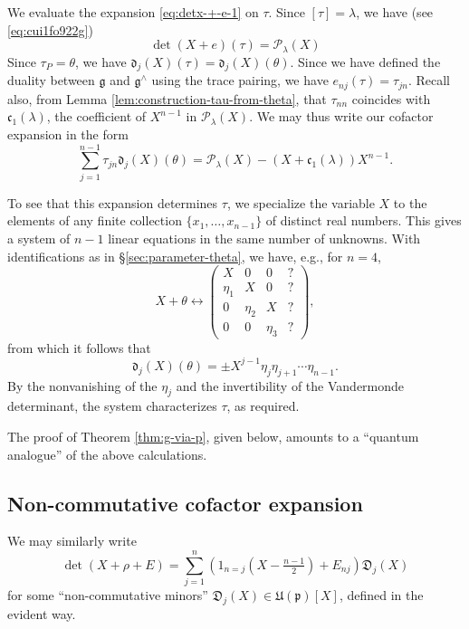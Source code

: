 
We evaluate the expansion \eqref{eq:detx-+-e-1} on $\tau$.  Since $[\tau] = \lambda$, we have (see \eqref{eq:cui1fo922g})
\begin{equation*}
  \det(X + e)(\tau) = \mathcal{P}_\lambda(X)
\end{equation*}
Since $\tau_P = \theta$, we have $\mathfrak{d}_j(X)(\tau) = \mathfrak{d}_j(X)(\theta)$.  Since we have defined the duality between $\mathfrak{g}$ and $\mathfrak{g}^\wedge$ using the trace pairing, we have $e_{n j}(\tau) = \tau_{j n}$.  Recall also, from Lemma \ref{lem:construction-tau-from-theta}, that $\tau_{n n}$ coincides with $\mathfrak{c}_1(\lambda)$, the coefficient of $X^{n-1}$ in $\mathcal{P}_\lambda(X)$.  We may thus write our cofactor expansion in the form
\[
  \sum_{j=1}^{n-1} \tau_{j n} \mathfrak{d}_j(X)(\theta) = \mathcal{P}_\lambda(X) - (X + \mathfrak{c}_1(\lambda)) X^{n-1}.
\]

To see that this expansion determines $\tau$, we specialize the variable $X$ to the elements of any finite collection $\{x_1,\dotsc,x_{n-1}\}$ of distinct real numbers.  This gives a system of $n-1$ linear equations in the same number of unknowns.  With identifications as in \S\ref{sec:parameter-theta}, we have, e.g., for $n=4$,
\begin{equation*}
  X + \theta
  \leftrightarrow
  \begin{pmatrix}
    X & 0 & 0 & ? \\
    \eta_1  & X  & 0 & ? \\
    0 & \eta_2  & X & ? \\
    0 & 0 & \eta_3  & ?
  \end{pmatrix},
\end{equation*}
from which it follows that
\begin{equation}\label{eqn:frak-d-j-X-tau}
  \mathfrak{d}_j(X)(\theta)
  =
  \pm
  X^{j-1}
  \eta_j \eta_{j+1} \dotsb \eta_{n-1}.
\end{equation}
By the nonvanishing of the $\eta_j$ and the invertibility of the Vandermonde determinant, the system characterizes $\tau$, as required.

The proof of Theorem \ref{thm:g-via-p}, given below, amounts to a ``quantum analogue'' of the above calculations.

\subsection{Non-commutative cofactor expansion}
We may similarly write
\begin{equation}\label{eqn:non-comm-cofactor}
  \det(X + \rho + E)
  =
  \sum_{j=1}^n
  \left(1_{n=j}
    \left(X
      - \tfrac{n-1}{2} \right)
    +
    E_{n j} \right)
  \mathfrak{D}_j(X)
\end{equation}
for some ``non-commutative minors'' $\mathfrak{D}_j(X) \in \mathfrak{U}(\mathfrak{p})[X]$, defined in the evident way.

